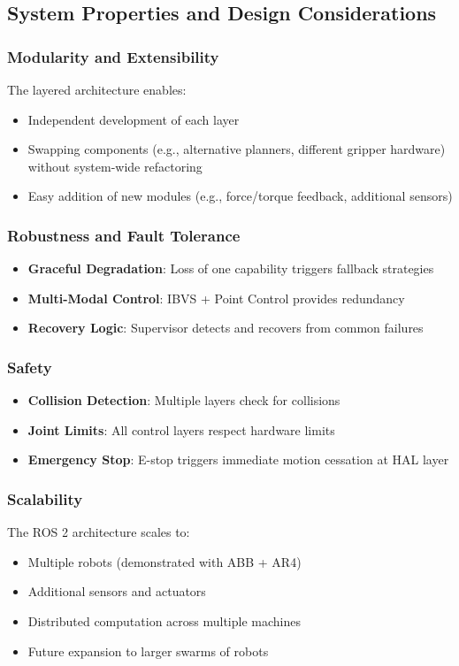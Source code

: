 \subsection{System Properties and Design Considerations}
\label{subsec:system_properties}

\subsubsection{Modularity and Extensibility}
The layered architecture enables:
\begin{itemize}
    \item Independent development of each layer
    \item Swapping components (e.g., alternative planners, different gripper hardware) without system-wide refactoring
    \item Easy addition of new modules (e.g., force/torque feedback, additional sensors)
\end{itemize}

\subsubsection{Robustness and Fault Tolerance}
\begin{itemize}
    \item \textbf{Graceful Degradation}: Loss of one capability triggers fallback strategies
    \item \textbf{Multi-Modal Control}: IBVS + Point Control provides redundancy
    \item \textbf{Recovery Logic}: Supervisor detects and recovers from common failures
\end{itemize}

\subsubsection{Safety}
\begin{itemize}
    \item \textbf{Collision Detection}: Multiple layers check for collisions
    \item \textbf{Joint Limits}: All control layers respect hardware limits
    \item \textbf{Emergency Stop}: E-stop triggers immediate motion cessation at HAL layer
\end{itemize}

\subsubsection{Scalability}
The ROS 2 architecture scales to:
\begin{itemize}
    \item Multiple robots (demonstrated with ABB + AR4)
    \item Additional sensors and actuators
    \item Distributed computation across multiple machines
    \item Future expansion to larger swarms of robots
\end{itemize}

